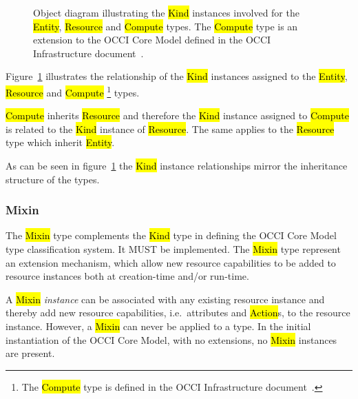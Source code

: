 \documentclass[10pt,a4paper]{article}
\begin{document}
\begin{figure}[!h]
  {\centering {} \par}
  \caption{Object diagram illustrating the \hl{Kind} instances
    involved for the \hl{Entity}, \hl{Resource} and \hl{Compute}
    types. The \hl{Compute} type is an extension to the OCCI Core
    Model defined in the OCCI Infrastructure
    document~\cite{occi:infrastructure}.}
  \label{fig:kind_relationships}
\end{figure}

Figure~\ref{fig:kind_relationships} illustrates the relationship of
the \hl{Kind} instances assigned to the \hl{Entity}, \hl{Resource} and
\hl{Compute}
\footnote{The \hl{Compute} type is defined in the OCCI Infrastructure
 document~\cite{occi:infrastructure}.}
types.

\hl{Compute} inherits \hl{Resource} and therefore the \hl{Kind}
instance assigned to \hl{Compute} is related to the \hl{Kind} instance
of \hl{Resource}.  The same applies to the \hl{Resource} type which
inherit \hl{Entity}.

As can be seen in figure~\ref{fig:kind_relationships} the \hl{Kind}
instance relationships mirror the inheritance structure of the types.

\subsubsection{Mixin}
The \hl{Mixin} type complements the \hl{Kind} type in defining the
OCCI Core Model type classification system. It MUST be
implemented. The \hl{Mixin} type represent an extension mechanism,
which allow new resource capabilities to be added to resource
instances both at creation-time and/or run-time.

A \hl{Mixin} {\em instance} can be associated with any existing
resource instance and thereby add new resource capabilities,
i.e.~attributes and \hl{Action}s, to the resource instance. However, a
\hl{Mixin} can never be applied to a type.  In the initial
instantiation of the OCCI Core Model, with no extensions, no
\hl{Mixin} instances are present.
\end{document}
